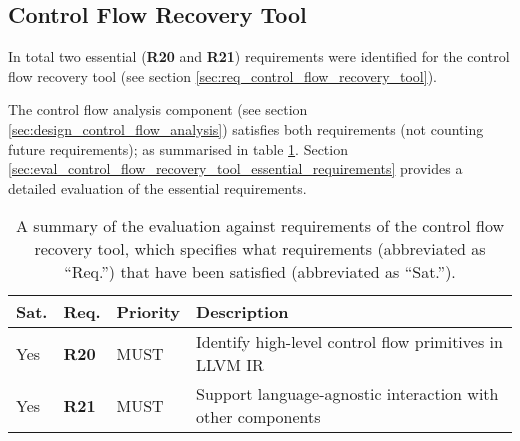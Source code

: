 
\subsection{Control Flow Recovery Tool}

In total two essential (\textbf{R20} and \textbf{R21}) requirements were identified for the control flow recovery tool (see section \ref{sec:req_control_flow_recovery_tool}).

The control flow analysis component (see section \ref{sec:design_control_flow_analysis}) satisfies both requirements (not counting future requirements); as summarised in table \ref{tbl:eval_summary_of_control_flow_recovery_tool}. Section \ref{sec:eval_control_flow_recovery_tool_essential_requirements} provides a detailed evaluation of the essential requirements.

\begin{table}[htbp]
	\begin{center}
		\begin{tabular}{|l|l|l|l|}
			\hline
			Sat. & Req. & Priority & Description \\
			\hline
			\rowcolor{light_green_3}
			Yes & \textbf{R20} & MUST & Identify high-level control flow primitives in LLVM IR \\
			\rowcolor{light_green_3}
			Yes & \textbf{R21} & MUST & Support language-agnostic interaction with other components \\
			\hline
		\end{tabular}
	\end{center}
	\caption{A summary of the evaluation against requirements of the control flow recovery tool, which specifies what requirements (abbreviated as ``Req.'') that have been satisfied (abbreviated as ``Sat.'').}
	\label{tbl:eval_summary_of_control_flow_recovery_tool}
\end{table}



